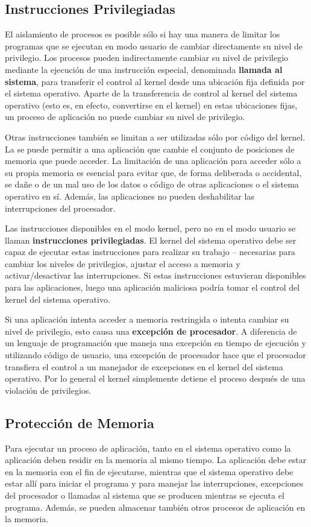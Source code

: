 \documentclass[10pt]{book}
\begin{document}
\subsection{Instrucciones Privilegiadas}
El aislamiento de procesos es posible sólo si hay una manera de limitar los programas que se ejecutan en modo usuario de cambiar directamente su nivel de privilegio. Los procesos pueden indirectamente cambiar su nivel de privilegio mediante la ejecución de una instrucción especial, denominada \textbf{llamada al sistema}, para transferir el control al kernel desde una ubicación fija definida por el sistema operativo. Aparte de la transferencia de control al kernel del sistema operativo (esto es, en efecto, convertirse en el kernel) en estas ubicaciones fijas, un proceso de aplicación no puede cambiar su nivel de privilegio.

Otras instrucciones también se limitan a ser utilizadas sólo por código del kernel. La se puede permitir a una aplicación que cambie el conjunto de posiciones de memoria que puede acceder. La limitación de una aplicación para acceder sólo a su propia memoria es esencial para evitar que, de forma deliberada o accidental, se dañe o de un mal uso de los datos o código de otras aplicaciones o el sistema operativo en sí. Además, las aplicaciones no pueden deshabilitar las interrupciones del procesador.

Las instrucciones disponibles en el modo kernel, pero no en el modo usuario se llaman \textbf{instrucciones privilegiadas}. El kernel del sistema operativo debe ser capaz de ejecutar estas instrucciones para realizar su trabajo -- necesarias para cambiar los niveles de privilegios, ajustar el acceso a memoria y activar/desactivar las interrupciones. Si estas instrucciones estuvieran disponibles para las aplicaciones, luego una aplicación maliciosa podría tomar el control del kernel del sistema operativo.

Si una aplicación intenta acceder a memoria restringida o intenta cambiar su nivel de privilegio, esto causa una \textbf{excepción de procesador}. A diferencia de un lenguaje de programación que maneja una excepción en tiempo de ejecución y utilizando código de usuario, una excepción de procesador hace que el procesador transfiera el control a un manejador de excepciones en el kernel del sistema operativo. Por lo general el kernel simplemente detiene el proceso después de una violación de privilegios.


\subsection{Protección de Memoria}
Para ejecutar un proceso de aplicación, tanto en el sistema operativo como la aplicación deben residir en la memoria al mismo tiempo. La aplicación debe estar en la memoria con el fin de ejecutarse, mientras que el sistema operativo debe estar allí para iniciar el programa y para manejar las interrupciones, excepciones del procesador o llamadas al sistema que se producen mientras se ejecuta el programa. Además, se pueden almacenar también otros procesos de aplicación en la memoria.
\end{document}
